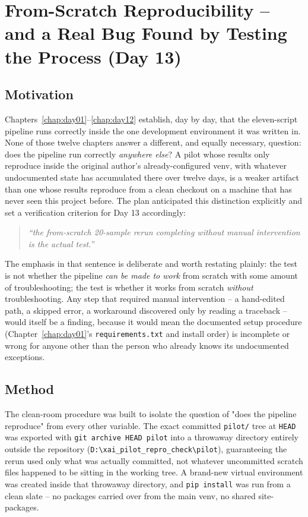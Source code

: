 \chapter{From-Scratch Reproducibility -- and a Real Bug Found by Testing the Process (Day 13)}
\label{chap:day13}

\section{Motivation}

Chapters~\ref{chap:day01}--\ref{chap:day12} establish, day by day, that the eleven-script pipeline
runs correctly inside the one development environment it was written in. None of those twelve
chapters answer a different, and equally necessary, question: does the pipeline run correctly
\emph{anywhere else}? A pilot whose results only reproduce inside the original author's already-configured
venv, with whatever undocumented state has accumulated there over twelve days, is a weaker artifact
than one whose results reproduce from a clean checkout on a machine that has never seen this project
before. The plan anticipated this distinction explicitly and set a verification criterion for Day 13
accordingly:

\begin{quote}
\itshape ``the from-scratch 20-sample rerun completing without manual intervention is the actual
test.''
\end{quote}

The emphasis in that sentence is deliberate and worth restating plainly: the test is not whether the
pipeline \emph{can be made to work} from scratch with some amount of troubleshooting; the test is
whether it works from scratch \emph{without} troubleshooting. Any step that required manual
intervention -- a hand-edited path, a skipped error, a workaround discovered only by reading a
traceback -- would itself be a finding, because it would mean the documented setup procedure
(Chapter~\ref{chap:day01}'s \texttt{requirements.txt} and install order) is incomplete or wrong for
anyone other than the person who already knows its undocumented exceptions.

\section{Method}

The clean-room procedure was built to isolate the question of "does the pipeline reproduce" from
every other variable. The exact committed \texttt{pilot/} tree at \texttt{HEAD} was exported with
\texttt{git archive HEAD pilot} into a throwaway directory entirely outside the repository
(\texttt{D:\textbackslash xai\_pilot\_repro\_check\textbackslash pilot}), guaranteeing the rerun used
only what was actually committed, not whatever uncommitted scratch files happened to be sitting in the
working tree. A brand-new virtual environment was created inside that throwaway directory, and
\texttt{pip install} was run from a clean slate -- no packages carried over from the main venv, no
shared site-packages.

